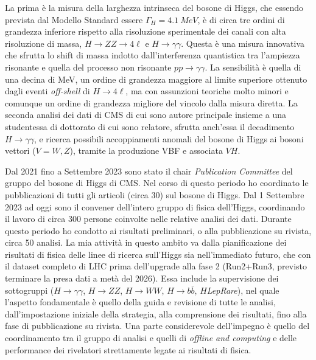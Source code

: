 \documentclass[a4paper,12pt,twoside]{article}
\begin{document}
{  La prima \`e la misura della larghezza intrinseca del bosone di
  Higgs, che essendo prevista dal Modello Standard essere
  $\Gamma_H=\SI{4.1}{MeV}$, \`e di circa tre ordini di grandezza
  inferiore rispetto alla risoluzione sperimentale dei canali con alta risoluzione di
  massa, $H\to ZZ\to 4\ell$ e $H\to\gamma\gamma$. Questa
  \`e una misura innovativa che sfrutta lo shift di massa indotto
  dall'interferenza quantistica tra l'ampiezza risonante e quella del
  processo non risonante $pp\to\gamma\gamma$. La sensibilit\`a \`e
  quella di una decina di MeV, un ordine di grandezza maggiore al limite superiore
  ottenuto dagli eventi {\it off-shell} di $H\to
  4\ell$, ma con assunzioni teoriche molto minori e comunque un ordine di grandezza migliore del vincolo dalla misura diretta.  La seconda analisi dei dati
  di CMS di cui sono autore principale insieme a una studentessa di dottorato di cui sono relatore, sfrutta anch'essa il decadimento $H\to\gamma\gamma$, e
  ricerca possibili accoppiamenti anomali del bosone
  di Higgs ai bosoni vettori ($V=W,Z$), tramite la produzione VBF e
  associata $VH$.

 Dal 2021 fino a Settembre 2023 sono stato il chair {\it Publication
   Committee} del gruppo del bosone di Higgs di CMS. Nel corso di
 questo periodo ho coordinato le pubblicazioni di tutti gli articoli
 (circa 30) sul bosone di Higgs. Dal 1 Settembre 2023 ad oggi sono il
 convener dell'intero gruppo di fisica dell'Higgs, coordinando il
 lavoro di circa 300 persone coinvolte nelle relative analisi dei
 dati. Durante questo periodo ho condotto ai risultati preliminari, o
 alla pubblicazione su rivista, circa 50 analisi. La mia
 attivit\`a in questo ambito va dalla pianificazione dei risultati di
 fisica delle linee di ricerca sull'Higgs sia nell'immediato futuro, che con il dataset completo di LHC prima dell'upgrade alla fase 2 (Run2+Run3, previsto terminare la presa dati
 a met\`a del 2026). Essa include la supervisione dei sottogruppi ($H\to\gamma\gamma$,
 $H\to ZZ$, $H\to WW$, $H\to b\bar{b}$, $H${\it LepRare}), nel quale l'aspetto fondamentale \`e quello della guida e revisione di tutte le analisi, dall'impostazione iniziale della strategia, alla comprensione dei risultati, fino alla fase di pubblicazione su rivista. Una parte considerevole dell'impegno \`e quello del coordinamento tra il gruppo di analisi e quelli di {\it offline
   and computing} e delle performance dei rivelatori strettamente legate
 ai risultati di fisica. 
 
}
\end{document}
